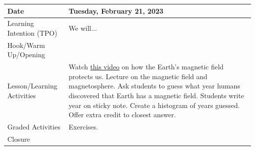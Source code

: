 \documentclass{article}
\numberwithin{equation}{section}
\numberwithin{figure}{section}
\begin{document}
\begin{tabular}{|m{}|m{}|}
    \hline  
    \cellcolor{black!20}\textbf{Date} &
    \cellcolor{black!20}\textbf{Tuesday, February 21, 2023} \\
    \hline
    Learning Intention (TPO) & We will... \\
    \hline
    Hook/Warm Up/Opening & \\
    \hline
    Lesson/Learning Activities & Watch \href{https://youtu.be/URN-XyZD2vQ}{this video} on how the Earth's magnetic field protects us. Lecture on the magnetic field and magnetosphere. Ask students to guess what year humans discovered that Earth has a magnetic field. Students write year on sticky note. Create a histogram of years guessed. Offer extra credit to closest answer.\\
    \hline
    Graded Activities & Exercises.\\
    \hline
    Closure & \\  
    \hline
\end{tabular}
\end{document}
